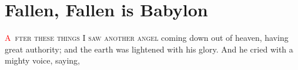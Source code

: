 
\chapter{Fallen, Fallen is Babylon}
\fancyhead{} %
\lettrine[lines=3,slope=0.5em]{\textcolor{red}{A}}{\ fter these things I saw another angel} coming down out of heaven, having great authority; and the earth was lightened with his glory.%
And he cried with a mighty voice, saying, 
